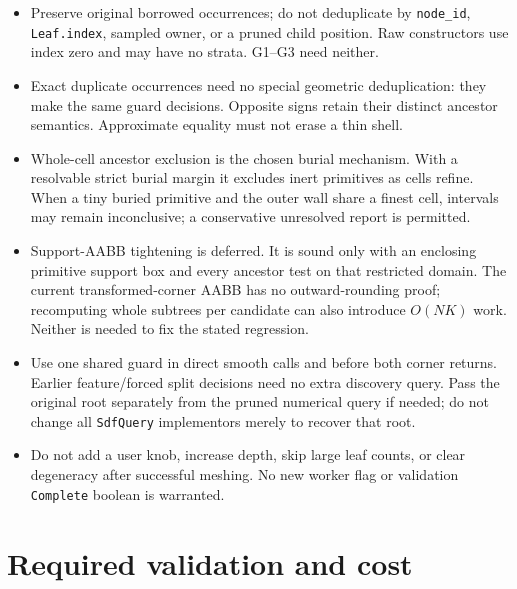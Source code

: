 \documentclass[11pt]{article}
\begin{document}
\begin{itemize}
\item Preserve original borrowed occurrences; do not deduplicate by
\texttt{node\_id}, \texttt{Leaf.index}, sampled owner, or a pruned child position.
Raw constructors use index zero and may have no strata. G1--G3 need neither.
\item Exact duplicate occurrences need no special geometric deduplication:
they make the same guard decisions. Opposite signs retain their distinct
ancestor semantics. Approximate equality must not erase a thin shell.
\item Whole-cell ancestor exclusion is the chosen burial mechanism. With a
resolvable strict burial margin it excludes inert primitives as cells refine.
When a tiny buried primitive and the outer wall share a finest cell, intervals
may remain inconclusive; a conservative unresolved report is permitted.
\item Support-AABB tightening is deferred. It is sound only with an enclosing
primitive support box and every ancestor test on that restricted domain.
The current transformed-corner AABB has no outward-rounding proof; recomputing
whole subtrees per candidate can also introduce \(O(NK)\) work. Neither is
needed to fix the stated regression.
\item Use one shared guard in direct smooth calls and before both corner
returns. Earlier feature/forced split decisions need no extra discovery query.
Pass the original root separately from the pruned numerical query if needed;
do not change all \texttt{SdfQuery} implementors merely to recover that root.
\item Do not add a user knob, increase depth, skip large leaf counts, or clear
degeneracy after successful meshing. No new worker flag or validation
\texttt{Complete} boolean is warranted.
\end{itemize}

\section{Required validation and cost}
\end{document}

